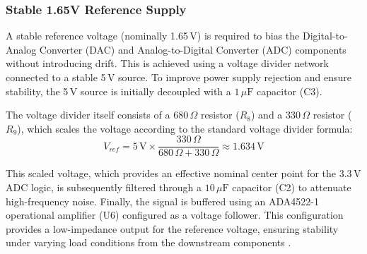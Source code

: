 \subsubsection{Stable 1.65V Reference Supply}\label{sec:1.65}



A stable reference voltage (nominally 1.65\,V) is required to bias the Digital-to-Analog Converter (DAC) and Analog-to-Digital Converter (ADC) components without introducing drift. This is achieved using a voltage divider network connected to a stable 5\,V source. To improve power supply rejection and ensure stability, the 5\,V source is initially decoupled with a $1\,\mu\mathrm{F}$ capacitor (C3).

The voltage divider itself consists of a $680\,\Omega$ resistor ($R_8$) and a $330\,\Omega$ resistor ($R_9$), which scales the voltage according to the standard voltage divider formula:
\begin{equation}
    V_{ref} = 5\,\mathrm{V} \times \frac{330\,\Omega}{680\,\Omega + 330\,\Omega} \approx 1.634\,\mathrm{V}
\end{equation}

This scaled voltage, which provides an effective nominal center point for the $3.3\,\mathrm{V}$ ADC logic, is subsequently filtered through a $10\,\mu\mathrm{F}$ capacitor (C2) to attenuate high-frequency noise. Finally, the signal is buffered using an ADA4522-1 operational amplifier (U6) configured as a voltage follower. This configuration provides a low-impedance output for the reference voltage, ensuring stability under varying load conditions from the downstream components \cite{ada4522_datasheet}.

